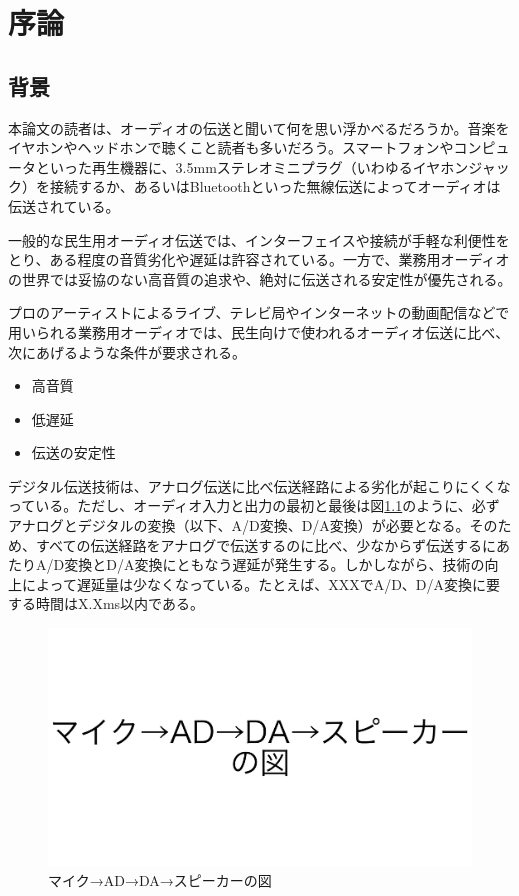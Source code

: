 \chapter{序論}
\label{chap:introduction}

\section{背景}
\label{section:background}

本論文の読者は、オーディオの伝送と聞いて何を思い浮かべるだろうか。音楽をイヤホンやヘッドホンで聴くこと読者も多いだろう。スマートフォンやコンピュータといった再生機器に、3.5mmステレオミニプラグ（いわゆるイヤホンジャック）を接続するか、あるいはBluetoothといった無線伝送によってオーディオは伝送されている。

一般的な民生用オーディオ伝送では、インターフェイスや接続が手軽な利便性をとり、ある程度の音質劣化や遅延は許容されている。一方で、業務用オーディオの世界では妥協のない高音質の追求や、絶対に伝送される安定性が優先される。

プロのアーティストによるライブ、テレビ局やインターネットの動画配信などで用いられる業務用オーディオでは、民生向けで使われるオーディオ伝送に比べ、次にあげるような条件が要求される。

\begin{itemize}
  \item 高音質
  \item 低遅延
  \item 伝送の安定性
\end{itemize}

デジタル伝送技術は、アナログ伝送に比べ伝送経路による劣化が起こりにくくなっている。ただし、オーディオ入力と出力の最初と最後は図\ref{fig:first_and_last_need_ad_da}のように、必ずアナログとデジタルの変換（以下、A/D変換、D/A変換）が必要となる。そのため、すべての伝送経路をアナログで伝送するのに比べ、少なからず伝送するにあたりA/D変換とD/A変換にともなう遅延が発生する。しかしながら、技術の向上によって遅延量は少なくなっている。たとえば、XXXでA/D、D/A変換に要する時間はX.Xms以内である。

\begin{figure}[htbp]
  \centering
  \label{fig:first_and_last_need_ad_da}
  \includegraphics[width=0.8\linewidth]{img/first_and_last_need_ad_da.pdf}
  \caption{マイク→AD→DA→スピーカーの図}
\end{figure}

